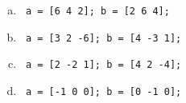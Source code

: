 \documentclass[12pt]{amsart}
\begin{document}
\begin{enumerate}
\begin{enumerate}[(a)]
\item \begin{verbatim} a = [6 4 2]; b = [2 6 4];\end{verbatim}
\item \begin{verbatim} a = [3 2 -6]; b = [4 -3 1];\end{verbatim}
\item \begin{verbatim} a = [2 -2 1]; b = [4 2 -4];\end{verbatim}
\item \begin{verbatim} a = [-1 0 0]; b = [0 -1 0];\end{verbatim}
\end{enumerate}

\end{enumerate}
\begin{comment}

\item Let $n$ be a positive integer.
We would like to list all strictly increasing sequences of 
positive integers with four terms: $a_1 < a_2 < a_3 < a_4$, such
that $a_1 + a_2 + a_3 + a_4 = n$. Please write an m-file defining
the function {\tt Sumfour(n)} which takes as input a positive integer,
and prints to the screen one partition per line.

For example, 
\begin{verbatim}
>> Sumfour(13)
1 + 2 + 3 + 7 
1 + 2 + 4 + 6 
1 + 3 + 4 + 5
\end{verbatim}
Please submit your code, and the output of {\tt Sumfour(17)}.
Hint: Your code might use a nested {\tt for} loop 
and the {\tt fprintf} command.

The Fibonacci sequence is defined as the sequence whose
first two terms are $s_1 = s_2 = 1$ and whose $n$-th
term  $s_n = s_{n-1} + s_{n-2'}$.

Write a function {\tt Fibonacci} that takes as input
a positive integer $n$ and prints every term 
of the Fibonacci sequence until the last term before it exceeds $n$.
\end{comment}
\end{document}
